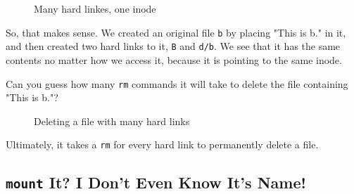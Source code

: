\documentclass[10pt,american,]{book}
\makeatletter
\newenvironment{Shaded}{\begin{snugshade}}{\end{snugshade}}
\newcommand{\KeywordTok}[1]{\textcolor[rgb]{0.13,0.29,0.53}{\textbf{{#1}}}}
\newcommand{\StringTok}[1]{\textcolor[rgb]{0.31,0.60,0.02}{{#1}}}
\newcommand{\NormalTok}[1]{{#1}}
\numberwithin{figure}{chapter}
\DeclareRobustCommand{\drcap}[1]{\begin{figure}[H]\caption{#1}\end{figure}}
\DeclareRobustCommand{\drcmd}[1]{\index{commands!#1@\texttt{#1}}}
\renewcommand{\KeywordTok}[1]{{#1}}
\renewcommand{\StringTok}[1]{{#1}}
\renewcommand{\NormalTok}[1]{{#1}}
\makeatother
\begin{document}
\drcap{Many hard linkes, one inode}

\begin{Shaded}
\end{Shaded}

So, that makes sense. We created an original file \texttt{b} by placing
"This is b." in it, and then created two hard links to it, \texttt{B}
and \texttt{d/b}. We see that it has the same contents no matter how we
access it, because it is pointing to the same inode.

Can you guess how many \texttt{rm}\drcmd{rm} commands it will take to
delete the file containing "This is b."?

\drcap{Deleting a file with many hard links}

\begin{Shaded}
\end{Shaded}

Ultimately, it takes a \texttt{rm} for every hard link to permanently
delete a file.

\subsection*{\texorpdfstring{\texttt{mount} It? I Don't Even Know It's
Name!}{mount It? I Don't Even Know It's Name!}}\label{mount-it-i-dont-even-know-its-name}
\end{document}
